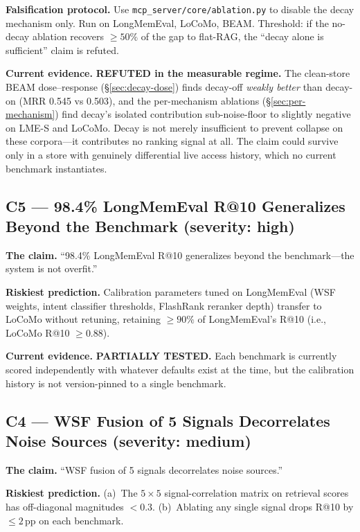 \documentclass[11pt]{article}
\begin{document}
\textbf{Falsification protocol.}  Use
\texttt{mcp\_server/core/ablation.py} to disable the decay
mechanism only.  Run on LongMemEval, LoCoMo, BEAM.  Threshold: if
the no-decay ablation recovers $\ge 50\%$ of the gap to flat-RAG,
the ``decay alone is sufficient'' claim is refuted.

\textbf{Current evidence.} \textbf{REFUTED in the measurable
regime.}  The clean-store BEAM dose--response
(\S\ref{sec:decay-dose}) finds decay-off \emph{weakly better} than
decay-on (MRR 0.545 vs 0.503), and the per-mechanism ablations
(\S\ref{sec:per-mechanism}) find decay's isolated contribution
sub-noise-floor to slightly negative on LME-S and LoCoMo.  Decay is
not merely insufficient to prevent collapse on these corpora---it
contributes no ranking signal at all.  The claim could survive only
in a store with genuinely differential live access history, which
no current benchmark instantiates.

\subsection{C5 --- 98.4\% LongMemEval R@10 Generalizes Beyond the Benchmark (severity: high)}
\label{app:popper-c5}

\textbf{The claim.} ``98.4\% LongMemEval R@10 generalizes beyond
the benchmark---the system is not overfit.''

\textbf{Riskiest prediction.}  Calibration parameters tuned on
LongMemEval (WSF weights, intent classifier thresholds, FlashRank
reranker depth) transfer to LoCoMo without retuning, retaining
$\ge 90\%$ of LongMemEval's R@10 (i.e., LoCoMo R@10 $\ge 0.88$).

\textbf{Current evidence.} \textbf{PARTIALLY TESTED.}  Each
benchmark is currently scored independently with whatever defaults
exist at the time, but the calibration history is not version-pinned
to a single benchmark.

\subsection{C4 --- WSF Fusion of 5 Signals Decorrelates Noise Sources (severity: medium)}
\label{app:popper-c4}

\textbf{The claim.} ``WSF fusion of 5 signals decorrelates noise
sources.''

\textbf{Riskiest prediction.}  (a)~The $5 \times 5$
signal-correlation matrix on retrieval scores has off-diagonal
magnitudes $< 0.3$.  (b)~Ablating any single signal drops R@10 by
$\le 2$\,pp on each benchmark.
\end{document}
